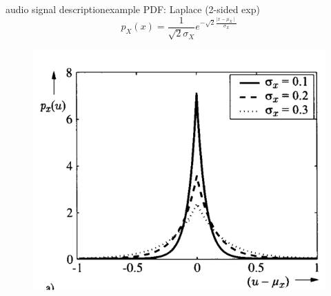 \begin{frame}{audio signal description}{example PDF: Laplace (2-sided exp)}
    \vspace{-5mm}
	\begin{equation*}
		p_X(x)= \frac{1}{\sqrt{2}\sigma_X}e^{-\sqrt{2}\frac{\mid x-\mu_X\mid}{\sigma_X}}
	\end{equation*}
	\begin{figure}
		\centering
			\includegraphics[scale=.5]{graph/laplacedist}
	\end{figure}
\end{frame}	

